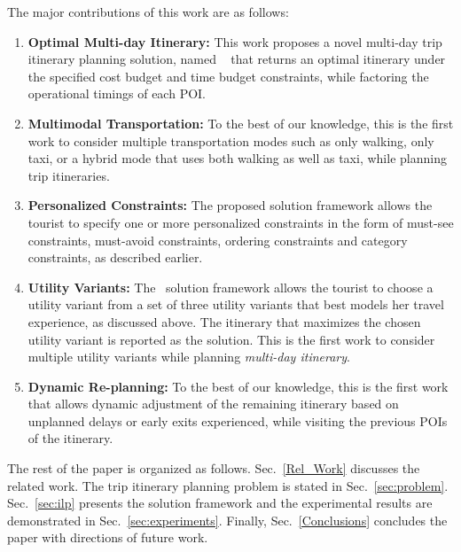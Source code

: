 The major contributions of this work are as follows:
%
\begin{enumerate}
\item \textbf{Optimal Multi-day Itinerary:} This work proposes a novel multi-day trip itinerary planning solution, named \trip~ that returns an optimal itinerary under the specified cost budget and time budget constraints, while factoring the operational timings of each POI.  
\item \textbf{Multimodal Transportation:} To the best of our knowledge, this is the first work to consider multiple transportation modes such as only walking, only taxi, or a hybrid mode that uses both walking as well as taxi, while planning trip itineraries.
\item \textbf{Personalized Constraints:} The proposed solution framework allows the tourist to specify one or more personalized constraints in the form of must-see constraints, must-avoid constraints, ordering constraints and category constraints, as described earlier.
\item \textbf{Utility Variants:} The \trip~solution framework allows the tourist to choose a utility variant from a set of three utility variants that best models her travel experience, as discussed above. The itinerary that maximizes the chosen utility variant is reported as the solution. This is the first work to consider multiple utility variants while planning \emph{multi-day itinerary}.
\item \textbf{Dynamic Re-planning:} To the best of our knowledge, this is the first work that allows dynamic adjustment of the remaining itinerary based on unplanned delays or early exits experienced, while visiting the previous POIs of the itinerary.
%
\end{enumerate}

The rest of the paper is organized as follows. Sec.~\ref{Rel_Work}  discusses the related work. The trip itinerary planning problem is stated in Sec.~\ref{sec:problem}. Sec.~\ref{sec:ilp} presents the \trip solution framework and the experimental results are demonstrated in Sec.~\ref{sec:experiments}. Finally, Sec.~\ref{Conclusions} concludes the paper with directions of future work.
